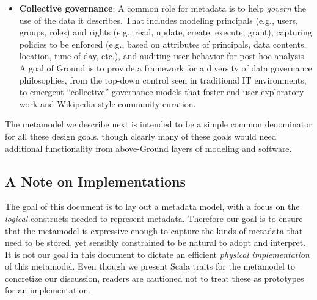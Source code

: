 \documentclass{article}
\begin{document}
\begin{itemize}
\item {\bf Collective governance}: A common role for metadata is to help \emph{govern} the use of the data it describes.  That includes modeling principals (e.g., users, groups, roles) and rights (e.g., read, update, create, execute, grant), capturing policies to be enforced (e.g., based on attributes of principals, data contents, location, time-of-day, etc.), and auditing user behavior for post-hoc analysis.
A goal of Ground is to provide a framework for a diversity of data governance philosophies, from the top-down control seen in traditional IT environments, to emergent ``collective'' governance models that foster end-user exploratory work and Wikipedia-style community curation.
\end{itemize}

The metamodel we describe next is intended to be a simple common denominator for all these design goals, though clearly many of these goals would need additional functionality from above-Ground layers of modeling and software.

\subsection{A Note on Implementations}
The goal of this document is to lay out a metadata model, with a focus on the \emph{logical} constructs needed to represent metadata.  Therefore our goal is to ensure that the metamodel is expressive enough to capture the kinds of metadata that need to be stored, yet sensibly constrained to be natural to adopt and interpret.  It is not our goal in this document to dictate an efficient \emph{physical implementation} of this metamodel.  Even though we present Scala traits for the metamodel to concretize our discussion, readers are cautioned not to treat these as prototypes for an implementation.
\end{document}
